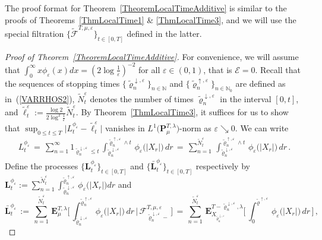 \documentclass[10pt]{article}
\numberwithin{equation}{section}
\theoremstyle{definition}
\begin{document}
The proof format for Theorem~\ref{TheoremLocalTimeAdditive} is similar to the proofs of  Theorems~\ref{ThmLocalTime1} \& \ref{ThmLocalTime3}, and we will use the special filtration $\{\widetilde{\mathscr{F}}^{T,\mu,\varepsilon}\}_{t\in [0,T]} $ defined in the latter. 
\begin{proof}[Proof of Theorem~\ref{TheoremLocalTimeAdditive}] For convenience, we will assume that $\int_{0}^{\infty} x\phi_{\varepsilon}(x)dx= ( 2\log\frac{1}{\varepsilon})^{-2} $ for all $\varepsilon\in (0,1)$, that is $\mathcal{E}=0$. 
Recall that the sequences of stopping times $ \{\widetilde{\varrho}_{n}^{\downarrow,\varepsilon}\}_{n\in \mathbb{N}}$ and $\{\widetilde{\varrho}_n^{\uparrow, \varepsilon}\}_{n\in \mathbb{N}_0}$ are defined as in~(\ref{VARRHOS2}), $\widetilde{N}_{t}^{\varepsilon}$ denotes the number of times $\widetilde{\varrho}_{n}^{\downarrow,\varepsilon}$ in the interval $[0,t]$, and  $\widetilde{\ell}_t^{\varepsilon}:=\frac{\log 2}{2\log^2\frac{1}{\varepsilon}  }\widetilde{N}_{t}^{\varepsilon}$.   By Theorem~\ref{ThmLocalTime3}, it suffices for us to show that  $ \sup_{0\leq t\leq T}\big|L^{\phi_\varepsilon}_t -\widetilde{\ell}^{\varepsilon}_t\big| $ vanishes in $L^1\big(\mathbf{P}_{\mu}^{T,\lambda}\big)$-norm  as $\varepsilon \searrow 0$. We can write
\begin{align*}
L_t^{\phi_\varepsilon}\,=\, \sum_{n=1  }^{\infty}1_{ \widetilde{\varrho}_{n}^{\downarrow,\varepsilon}\leq t} \, \int_{ \widetilde{\varrho}_{n}^{\downarrow,\varepsilon} }^{\widetilde{\varrho}_{n}^{\uparrow,\varepsilon}\wedge t } \,     \phi_{\varepsilon}\big(|X_r|\big)\,dr \,=\,   \sum_{n=1  }^{\widetilde{N}_{t}^{\varepsilon}}\, \int_{ \widetilde{\varrho}_{n}^{\downarrow,\varepsilon} }^{\widetilde{\varrho}_{n}^{\uparrow,\varepsilon}\wedge t } \,     \phi_{\varepsilon}\big(|X_r|\big)\,dr 
 \,.   
 \end{align*}
Define the processes $\{ \mathbf{L}_t^{\phi_\varepsilon} \}_{t\in [0,T]}$ and  $\{ \mathbf{\bar{L}}_t^{\phi_\varepsilon}\}_{t\in [0,T]}$ respectively by $\mathbf{L}_t^{\phi_\varepsilon} :=  \sum_{n=1  }^{\widetilde{N}_{t}^{\varepsilon}} \int_{ \widetilde{\varrho}_{n}^{\downarrow,\varepsilon} }^{\widetilde{\varrho}_{n}^{\uparrow,\varepsilon}}   \,   \phi_{\varepsilon}\big(|X_r|\big) dr  $ and
$$\mathbf{\bar{L}}_t^{\phi_\varepsilon} \,:=\,   \sum_{n=1  }^{\widetilde{N}_{t}^{\varepsilon}}\, \mathbf{E}^{T,\lambda}_{\mu}\Bigg[\, \int_{ \widetilde{\varrho}_{n}^{\downarrow,\varepsilon} }^{\widetilde{\varrho}_{n}^{\uparrow,\varepsilon}} \,     \phi_{\varepsilon}\big(|X_r|\big)\,dr  \,\Bigg|\,  \mathscr{F}_{\widetilde{\varrho}_{n}^{\downarrow,\varepsilon}-  }^{T,\mu,\varepsilon}\,\Bigg]\,=\,\sum_{n=1  }^{\widetilde{N}_{t}^{\varepsilon}}\, \mathbf{E}^{T-\widetilde{\varrho}_{n}^{\downarrow,\varepsilon}  ,\lambda}_{X_{ \widetilde{\varrho}_{n}^{\downarrow,\varepsilon} }}\bigg[\, \int_{ 0}^{\widetilde{\varrho}^{\uparrow,\varepsilon} }  \,    \phi_{\varepsilon}\big(|X_r|\big)\,dr \, \bigg]\,,
$$
\end{proof}
\end{document}
